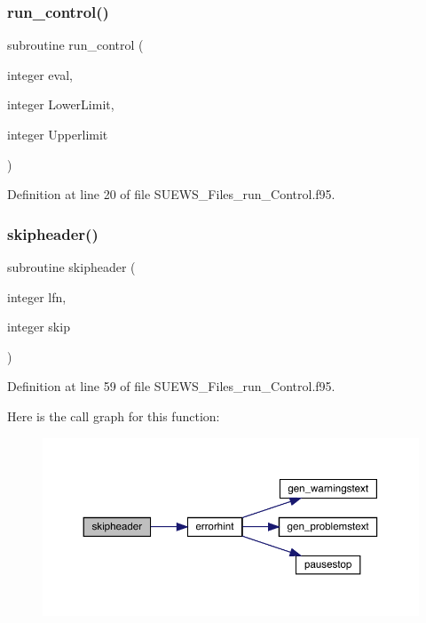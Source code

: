 \subsubsection{\texorpdfstring{run\+\_\+control()}{run\_control()}}
{\footnotesize\ttfamily subroutine run\+\_\+control (\begin{DoxyParamCaption}\item[{integer}]{eval,  }\item[{integer}]{Lower\+Limit,  }\item[{integer}]{Upperlimit }\end{DoxyParamCaption})}



Definition at line 20 of file S\+U\+E\+W\+S\+\_\+\+Files\+\_\+run\+\_\+\+Control.\+f95.

\mbox{\label{_s_u_e_w_s___files__run___control_8f95_ae44cbbd569ec2cdbd9f3c93b9a353ade}} 
\subsubsection{\texorpdfstring{skipheader()}{skipheader()}}
{\footnotesize\ttfamily subroutine skipheader (\begin{DoxyParamCaption}\item[{integer}]{lfn,  }\item[{integer}]{skip }\end{DoxyParamCaption})}



Definition at line 59 of file S\+U\+E\+W\+S\+\_\+\+Files\+\_\+run\+\_\+\+Control.\+f95.

Here is the call graph for this function\+:\nopagebreak
\begin{figure}[H]
\begin{center}
\leavevmode
\includegraphics[width=350pt]{_s_u_e_w_s___files__run___control_8f95_ae44cbbd569ec2cdbd9f3c93b9a353ade_cgraph}
\end{center}
\end{figure}
